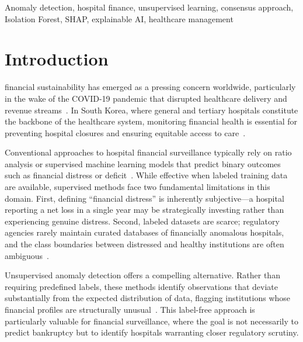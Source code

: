\documentclass{ieeeaccess}
\begin{document}
\begin{keywords}
Anomaly detection, hospital finance, unsupervised learning, consensus approach, Isolation Forest, SHAP, explainable AI, healthcare management
\end{keywords}

\titlepgskip=-15pt

\maketitle

\section{Introduction}
\label{sec:intro}

 financial sustainability has emerged as a pressing concern worldwide, particularly in the wake of the COVID-19 pandemic that disrupted healthcare delivery and revenue streams~\cite{cutler2020impact, khullar2020covid}. In South Korea, where general and tertiary hospitals constitute the backbone of the healthcare system, monitoring financial health is essential for preventing hospital closures and ensuring equitable access to care~\cite{yeo2018closure, lee2024covid}.

Conventional approaches to hospital financial surveillance typically rely on ratio analysis or supervised machine learning models that predict binary outcomes such as financial distress or deficit~\cite{bai2016analysis, oner2024hospital}. While effective when labeled training data are available, supervised methods face two fundamental limitations in this domain. First, defining ``financial distress'' is inherently subjective---a hospital reporting a net loss in a single year may be strategically investing rather than experiencing genuine distress. Second, labeled datasets are scarce; regulatory agencies rarely maintain curated databases of financially anomalous hospitals, and the class boundaries between distressed and healthy institutions are often ambiguous~\cite{kim2024financial}.

Unsupervised anomaly detection offers a compelling alternative. Rather than requiring predefined labels, these methods identify observations that deviate substantially from the expected distribution of data, flagging institutions whose financial profiles are structurally unusual~\cite{chandola2009anomaly, pang2021deep}. This label-free approach is particularly valuable for financial surveillance, where the goal is not necessarily to predict bankruptcy but to identify hospitals warranting closer regulatory scrutiny.
\end{document}
